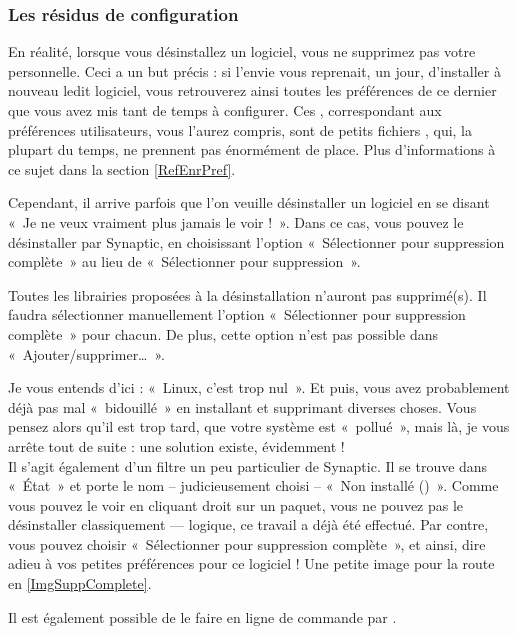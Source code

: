 {\subsubsection{Les résidus de configuration}
En réalité, lorsque vous désinstallez un logiciel, vous ne supprimez pas votre  personnelle. Ceci a un but précis : si l'envie vous reprenait, un jour, d'installer à nouveau ledit logiciel, vous retrouverez ainsi toutes les préférences de ce dernier que vous avez mis tant de temps à configurer. Ces , correspondant aux préférences utilisateurs, vous l'aurez compris, sont de petits fichiers , qui, la plupart du temps, ne prennent pas énormément de place. Plus d'informations à ce sujet dans la section \ref{RefEnrPref}.\par
Cependant, il arrive parfois que l'on veuille désinstaller un logiciel en se disant «~Je ne veux vraiment plus jamais le voir !~». Dans ce cas, vous pouvez le désinstaller par Synaptic, en choisissant l'option «~Sélectionner pour suppression complète~» au lieu de «~Sélectionner pour suppression~».
\begin{attention}
Toutes les librairies proposées à la désinstallation n'auront pas  supprimé(s). Il faudra sélectionner manuellement l'option «~Sélectionner pour suppression complète~» pour chacun. De plus, cette option n'est pas possible dans «~Ajouter/supprimer\dots{}~».
\end{attention}\par
Je vous entends d'ici : «~Linux, c'est trop nul~». Et puis, vous avez probablement déjà pas mal «~bidouillé~» en installant et supprimant diverses choses. Vous pensez alors qu'il est trop tard, que votre système est «~pollué~», mais là, je vous arrête tout de suite : une solution existe, évidemment !\\
Il s'agit également d'un filtre un peu particulier de Synaptic. Il se trouve dans «~État~» et porte le nom -- judicieusement choisi -- «~Non installé ()~». Comme vous pouvez le voir en cliquant droit sur un paquet, vous ne pouvez pas le désinstaller classiquement --- logique, ce travail a déjà été effectué. Par contre, vous pouvez choisir «~Sélectionner pour suppression complète~», et ainsi, dire adieu à vos petites préférences pour ce logiciel ! Une petite image pour la route en \ref{ImgSuppComplete}.
\begin{nota}
Il est également possible de le faire en ligne de commande par  .
\end{nota}
}
